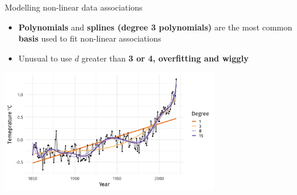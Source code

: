 \documentclass[english]{beamer}
\newcommand{\alertblue}[1]{{\color{blue}#1}}
\begin{document}
\begin{frame}{Modelling non-linear data associations}
    \begin{itemize}
        \item \alertblue{\textbf{Polynomials}} and \alertblue{\textbf{splines (degree 3 polynomials)}} are the most common \alertblue{\textbf{basis}} used to fit non-linear associations 
        \item Unusual to use \(d\) greater than \alertblue{\textbf{3 or 4, overfitting and wiggly}} 
    \end{itemize}
    \centering
    \includegraphics[width=9.5cm,keepaspectratio]{images/overfit.jpg}
\end{frame}
\end{document}
